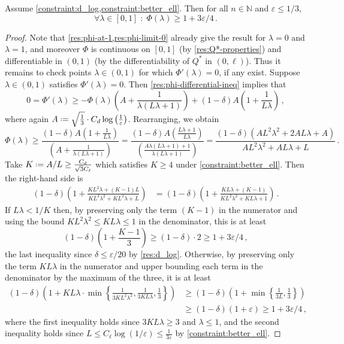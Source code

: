 \documentclass{theoretics}
\newcommand*{\define}{\mathrel{\vcenter{\baselineskip0.5ex \lineskiplimit0pt
                      \hbox{\scriptsize.}\hbox{\scriptsize.}}}%
                      =}
\newcommand{\bN}{\ensuremath{\mathbb{N}}}
\renewcommand{\epsilon}{\varepsilon}
\begin{document}
\begin{lemma}
    \label{res:phi_bound}
Assume \cref{constraint:d_log,constraint:better_ell}. Then for all $n \in \bN$ and $\epsilon \leq
1/3$,
\[
  \forall \lambda \in [0,1] \;:\; \Phi(\lambda) \ge 1 + 3\epsilon/4 \,.
\]
\end{lemma}
\begin{proof}
    Note that \cref{res:phi-at-1,res:phi-limit-0} already give the result for $\lambda = 0$ and
    $\lambda = 1$, and moreover $\Phi$ is continuous on $[0,1]$ (by
    \cref{res:Q*-properties}) and differentiable in $(0,1)$ (by the differentiability of $Q^*$ in
    $(0, \ell)$).
    Thus it remains
    to check points $\lambda \in (0,1)$ for which $\Phi'(\lambda) = 0$, if any exist. Suppose
    $\lambda \in (0,1)$ satisfies $\Phi'(\lambda) = 0$. Then \cref{res:phi-differential-ineq}
    implies that
    \[
        0 = \Phi'(\lambda)
        \ge -\Phi(\lambda)
            \left( A + \frac{1}{\lambda (L\lambda + 1)} \right)
            + (1-\delta)A \left( 1 + \frac{1}{L\lambda} \right) \,,
    \]
    where again $A \define \sqrt{\frac{1}{3}} \cdot C_d \log\left(\frac{1}{\epsilon}\right)$.
    Rearranging, we obtain
    \[
        \Phi(\lambda)
        \ge \frac{(1-\delta)A \left( 1 + \frac{1}{L\lambda} \right)}
                 {\left( A + \frac{1}{\lambda (L\lambda + 1)} \right)}
        = \frac{(1-\delta)A \left( \frac{L\lambda + 1}{L\lambda} \right)}
                 {\left(\frac{A \lambda (L\lambda + 1) + 1}{\lambda (L\lambda + 1)} \right)}
        = \frac{(1-\delta) (AL^2\lambda^2 + 2AL\lambda + A)}
                 {AL^2\lambda^2 + AL\lambda + L} \,.
    \]
    Take $K \define A/L \geq \tfrac{C_d}{\sqrt{3}C_\ell}$ which satisfies $K \geq 4$ 
under \cref{constraint:better_ell}. Then the right-hand side is
\begin{align*}
  (1-\delta)\left(1 + \frac{KL^2\lambda + (K-1)L}{KL^3\lambda^2 + KL^2\lambda + L}\right)
  &= (1-\delta)\left(1 + \frac{KL\lambda + (K-1)}{KL^2\lambda^2 + KL\lambda + 1}\right) \,.
\end{align*}
If $L\lambda < 1/K$ then, by preserving only the term $(K-1)$ in the numerator and using the
bound $K L^2 \lambda^2 \le KL\lambda \le 1$ in the denominator, this is at least
\[
  (1-\delta)\left(1 + \frac{K-1}{3}\right) \geq (1-\delta) \cdot 2 \ge 1 + 3\epsilon/4 \,,
\]
the last inequality since $\delta \le \epsilon/20$ by \cref{res:d_log}. Otherwise, by preserving
only the term $KL\lambda$ in the numerator and upper bounding each term in the denominator by the
maximum of the three, it is at least
\begin{align*}
  (1-\delta)\left(1 + KL\lambda \cdot
    \min\left\{ \frac{1}{3KL^2\lambda^2}, \frac{1}{3KL\lambda}, \frac{1}{3} \right\} \right)
&\geq 
  (1-\delta)\left(1 + \min\left\{ \frac{1}{3L}, \frac{1}{3} \right\} \right) \\
&\ge (1-\delta)(1+\epsilon)
\ge 1 + 3\epsilon/4 \,,
\end{align*}
where the first inequality holds since $3KL\lambda \ge 3$ and $\lambda \le 1$, and the
second inequality holds since $L \leq C_\ell \log(1/\epsilon) \leq
\frac{1}{3\epsilon}$ by \cref{constraint:better_ell}.
\end{proof}
\end{document}
